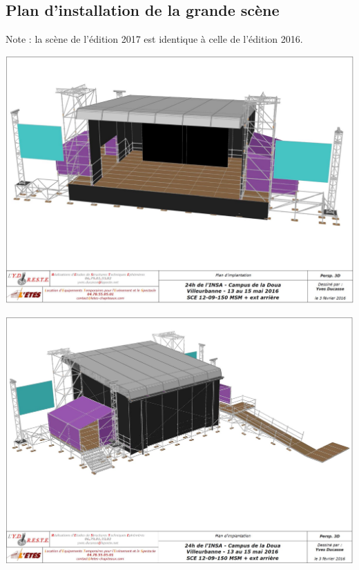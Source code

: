 \documentclass[hidelinks, paper=a4, fontsize=13pt]{report}
\begin{document}
\subsection{Plan d'installation de la grande scène}
Note : la scène de l’édition 2017 est identique à celle de l’édition 2016.
\begin{center}
	\includegraphics[scale=0.40, angle=90]{Annexes/Images/scene1}
\end{center}

\begin{center}
	\includegraphics[scale=0.45, angle=90]{Annexes/Images/scene2}
\end{center}
\end{document}

